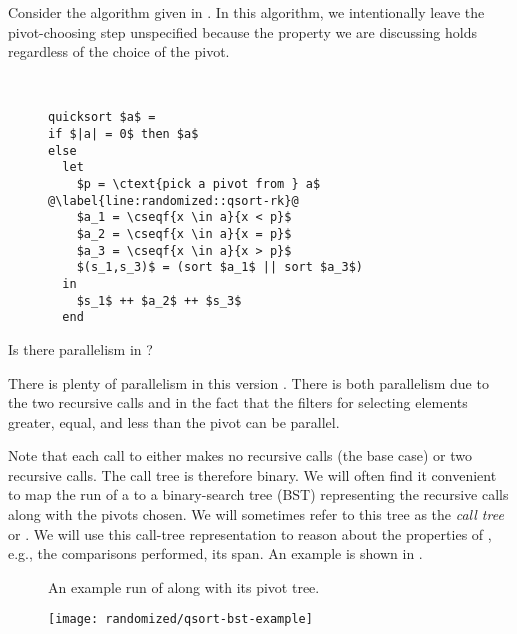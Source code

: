{Consider the \qsort{} algorithm given in .
In this algorithm, we intentionally leave the pivot-choosing step
unspecified because the property we are discussing holds regardless of
the choice of the pivot.

\begin{figure}
\begin{algorithm}[Quicksort]~
\label{alg:randomized::qsort}
\begin{lstlisting}
quicksort $a$ =
if $|a| = 0$ then $a$
else 
  let
    $p = \ctext{pick a pivot from } a$ @\label{line:randomized::qsort-rk}@
    $a_1 = \cseqf{x \in a}{x < p}$
    $a_2 = \cseqf{x \in a}{x = p}$
    $a_3 = \cseqf{x \in a}{x > p}$
    $(s_1,s_3)$ = (sort $a_1$ || sort $a_3$)
  in
    $s_1$ ++ $a_2$ ++ $s_3$
  end
\end{lstlisting}
\end{algorithm}
\end{figure}

\begin{question}
Is there parallelism in \qsort{}?
\end{question}

There is plenty of parallelism in this version \qsort{}.
%
There is both parallelism due to the two recursive calls and in the
fact that the filters for selecting elements greater, equal, and less
than the pivot can be parallel.


Note that each call to \qsort{} either makes no recursive calls (the
base case) or two recursive calls.  The call tree is therefore binary.
We will often find it convenient to map the run of a \qsort{} to a
binary-search tree (BST) representing the recursive calls along with
the pivots chosen.  
%
We will sometimes refer to this tree as the {\em call tree} or
.
%
We will use this call-tree representation to reason about the
properties of \qsort{}, e.g., the comparisons performed, its span.  An
example is shown in .

\begin{figure}
\begin{example}
\label{ex:randomized::qsort}
An example run of \qsort{} along with its pivot tree.
\begin{center}
\texttt{[image: randomized/qsort-bst-example]}
\end{center}
\end{example}
\end{figure}



}
